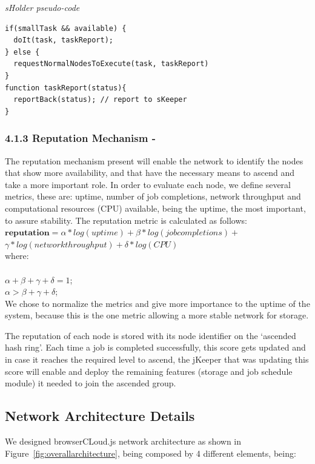 \textit{sHolder pseudo-code}
\begingroup
\scriptsize
\begin{verbatim}
if(smallTask && available) {
  doIt(task, taskReport);
} else {
  requestNormalNodesToExecute(task, taskReport)
}
function taskReport(status){
  reportBack(status); // report to sKeeper
}
\end{verbatim}
\endgroup

\subsubsection{4.1.3 Reputation Mechanism -}


The reputation mechanism present will enable the network to identify the nodes that show more availability, and that have the necessary means to ascend and take a more important role. In order to evaluate each node, we define several metrics, these are: uptime, number of job completions, network throughput and computational resources (CPU) available, being the uptime, the most important, to assure stability. The reputation metric is calculated as follows: \\

$ \textbf{reputation} = \alpha * log(uptime) + \beta * log(job completions) + $ \\
$          \gamma * log(network throughput) + \delta * log (CPU)$
\\
where: \\
\\
  $\alpha+ \beta+ \gamma+ \delta = 1$; \\
  $\alpha > \beta + \gamma + \delta$;  \\

We chose to normalize the metrics and give more importance to the uptime of the system, because this is the one metric allowing a more stable network for storage.

The reputation of each node is stored with its node identifier on the `ascended hash ring'. Each time a job is completed successfully, this score gets updated and in case it reaches the required level to ascend, the jKeeper that was updating this score will enable and deploy the remaining features (storage and job schedule module) it needed to join the ascended group. 

\subsection{Network Architecture Details}

We designed browserCLoud.js network architecture as shown in Figure~\ref{fig:overallarchitecture}, being composed by 4 different elements, being:

